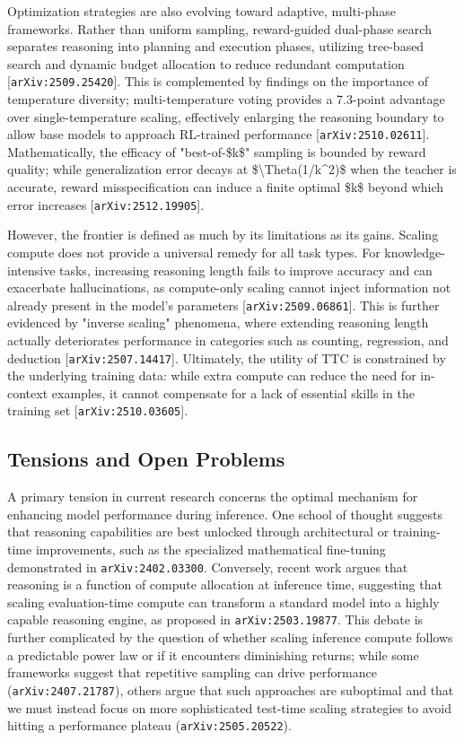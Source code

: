 \documentclass[11pt]{article}
\begin{document}
Optimization strategies are also evolving toward adaptive, multi-phase frameworks. Rather than uniform sampling, reward-guided dual-phase search separates reasoning into planning and execution phases, utilizing tree-based search and dynamic budget allocation to reduce redundant computation [\texttt{arXiv:2509.25420}]. This is complemented by findings on the importance of temperature diversity; multi-temperature voting provides a 7.3-point advantage over single-temperature scaling, effectively enlarging the reasoning boundary to allow base models to approach RL-trained performance [\texttt{arXiv:2510.02611}]. Mathematically, the efficacy of "best-of-\$k\$" sampling is bounded by reward quality; while generalization error decays at \$\textbackslash{}Theta(1/k\textasciicircum{}2)\$ when the teacher is accurate, reward misspecification can induce a finite optimal \$k\$ beyond which error increases [\texttt{arXiv:2512.19905}].

However, the frontier is defined as much by its limitations as its gains. Scaling compute does not provide a universal remedy for all task types. For knowledge-intensive tasks, increasing reasoning length fails to improve accuracy and can exacerbate hallucinations, as compute-only scaling cannot inject information not already present in the model's parameters [\texttt{arXiv:2509.06861}]. This is further evidenced by "inverse scaling" phenomena, where extending reasoning length actually deteriorates performance in categories such as counting, regression, and deduction [\texttt{arXiv:2507.14417}]. Ultimately, the utility of TTC is constrained by the underlying training data: while extra compute can reduce the need for in-context examples, it cannot compensate for a lack of essential skills in the training set [\texttt{arXiv:2510.03605}].

\subsection{Tensions and Open Problems}

A primary tension in current research concerns the optimal mechanism for enhancing model performance during inference. One school of thought suggests that reasoning capabilities are best unlocked through architectural or training-time improvements, such as the specialized mathematical fine-tuning demonstrated in \texttt{arXiv:2402.03300}. Conversely, recent work argues that reasoning is a function of compute allocation at inference time, suggesting that scaling evaluation-time compute can transform a standard model into a highly capable reasoning engine, as proposed in \texttt{arXiv:2503.19877}. This debate is further complicated by the question of whether scaling inference compute follows a predictable power law or if it encounters diminishing returns; while some frameworks suggest that repetitive sampling can drive performance (\texttt{arXiv:2407.21787}), others argue that such approaches are suboptimal and that we must instead focus on more sophisticated test-time scaling strategies to avoid hitting a performance plateau (\texttt{arXiv:2505.20522}).
\end{document}
